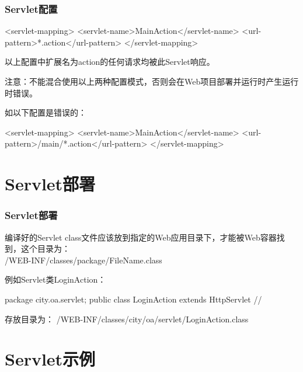 \begin{frame}[fragile] %
\frametitle{Servlet配置}

\begin{xmlCode}
<servlet-mapping>
  <servlet-name>MainAction</servlet-name>
  <url-pattern>*.action</url-pattern>
</servlet-mapping>
\end{xmlCode}

以上配置中扩展名为action的任何请求均被此Servlet响应。

{\Red\kai 注意：不能混合使用以上两种配置模式，否则会在Web项目部署并运行时产生运行时错误。}

如以下配置是错误的：

\begin{xmlCode}
<servlet-mapping>
  <servlet-name>MainAction</servlet-name>
  <url-pattern>/main/*.action</url-pattern>
</servlet-mapping>
\end{xmlCode}
\end{frame}

\section{Servlet部署}

\begin{frame}[fragile] %
\frametitle{Servlet部署}

编译好的Servlet class文件应该放到指定的Web应用目录下，才能被Web容器找到，这个目录为：\\
{\Red /WEB-INF/classes/package/FileName.class}

例如Servlet类LoginAction：
\begin{javaCode}
package city.oa.servlet;
public class LoginAction extends HttpServlet {
  //     
}
\end{javaCode}

存放目录为：
{\Blue /WEB-INF/classes/city/oa/servlet/LoginAction.class}
\end{frame}

\section{Servlet示例} 

